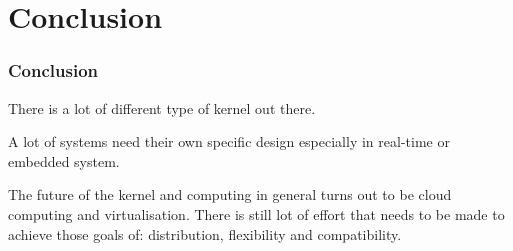 \section{Conclusion}
\begin{frame}
  \frametitle{Conclusion}
        There is a lot of different type of kernel out there.

        \-

        A lot of systems need their own specific design especially in real-time or embedded system.

        \-

        The future of the kernel and computing in general turns out to be cloud computing and virtualisation.
        There is still lot of effort that needs to be made to achieve those goals of: distribution, flexibility and compatibility.
\end{frame}



